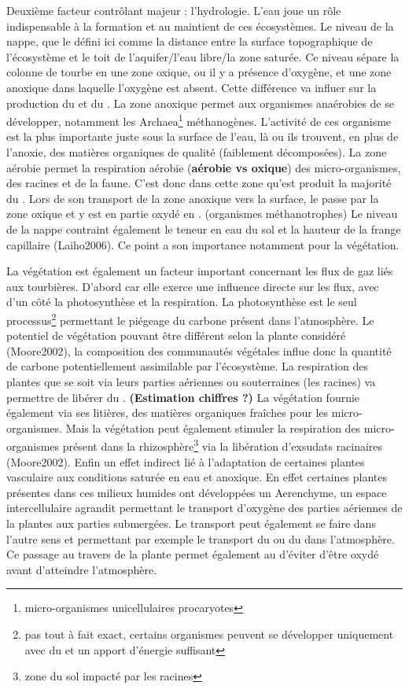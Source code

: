 Deuxième facteur contrôlant majeur : l'hydrologie.
L'eau joue un rôle indispensable à la formation et au maintient de ces écosystèmes.
Le niveau de la nappe, que le défini ici comme la distance entre la surface topographique de l'écosystème et le toit de l'aquifer/l'eau libre/la zone saturée.
Ce niveau sépare la colonne de tourbe en une zone oxique, ou il y a présence d'oxygène, et une zone anoxique dans laquelle l'oxygène est absent.
Cette différence va influer sur la production du \coo et du \chh.
La zone anoxique permet aux organismes anaérobies de se développer, notamment les Archaea\footnote{micro-organismes unicellulaires procaryotes} méthanogènes.
L'activité de ces organisme est la plus importante juste sous la surface de l'eau, là ou ils trouvent, en plus de l'anoxie, des matières organiques de qualité (faiblement décomposées).
La zone aérobie permet la respiration aérobie (\textbf{aérobie vs oxique}) des micro-organismes, des racines et de la faune.
C'est donc dans cette zone qu'est produit la majorité du \coo.
Lors de son transport de la zone anoxique vers la surface, le \chh passe par la zone oxique et y est en partie oxydé en \coo.
(organismes méthanotrophes)
Le niveau de la nappe contraint également le teneur en eau du sol et la hauteur de la frange capillaire (Laiho2006).
Ce point a son importance notamment pour la végétation.

La végétation est également un facteur important concernant les flux de gaz liés aux tourbières.
D'abord car elle exerce une influence directe sur les flux, avec d'un côté la photosynthèse et la respiration.
La photosynthèse est le seul processus\footnote{pas tout à fait exact, certains organismes peuvent se développer uniquement avec du \coo et un apport d'énergie suffisant} permettant le piégeage du carbone présent dans l'atmosphère.
Le potentiel de végétation pouvant être différent selon la plante considéré (Moore2002), la composition des communautés végétales influe donc la quantité de carbone potentiellement assimilable par l'écosystème.
La respiration des plantes que se soit via leurs parties aériennes ou souterraines (les racines) va permettre de libérer du \coo.
\textbf{(Estimation chiffres ?)}
La végétation fournie également via ses litières, des matières organiques fraîches pour les micro-organismes.
Mais la végétation peut également stimuler la respiration des micro-organismes présent dans la rhizosphère\footnote{zone du sol impacté par les racines} via la libération d'exsudats racinaires (Moore2002).
Enfin un effet indirect lié à l'adaptation de certaines plantes vasculaire aux conditions saturée en eau et anoxique.
En effet certaines plantes présentes dans ces milieux humides ont développées un Aerenchyme, un espace intercellulaire agrandit permettant le transport d'oxygène des parties aériennes de la plantes aux parties submergées.
Le transport peut également se faire dans l'autre sens et permettant par exemple le transport du \coo ou du \chh dans l'atmosphère.
Ce passage au travers de la plante permet également au \chh d'éviter d'être oxydé avant d'atteindre l'atmosphère.



